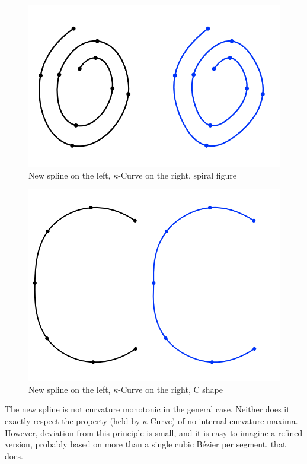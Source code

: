 \documentclass{article}
\newcommand{\kcurve}{$\kappa$-Curve}
\begin{document}
\begin{figure}
\centering
\includegraphics[scale=0.5]{biparab_mine_spiral}
\caption{New spline on the left{}, \kcurve{} on the right, spiral figure}
\label{spiral}
\end{figure}

\begin{figure}
\centering
\includegraphics[scale=0.5]{biparab_mine_c}
\caption{New spline on the left{}, \kcurve{} on the right, C shape}
\label{cshape}
\end{figure}

The new spline is not curvature monotonic in the general case. Neither does it exactly respect the property (held by \kcurve) of no internal curvature maxima. However, deviation from this principle is small, and it is easy to imagine a refined version, probably based on more than a single cubic B{\'e}zier per segment, that does.
\end{document}

